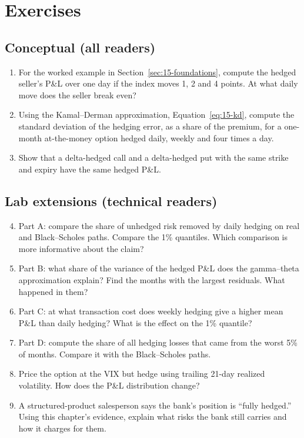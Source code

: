 \section*{Exercises}

\subsection*{Conceptual (all readers)}

\begin{enumerate}
  \item For the worked example in Section~\ref{sec:15-foundations}, compute the hedged seller's P\&L over one day if the index moves 1, 2 and 4 points. At what daily move does the seller break even?
  \item Using the Kamal--Derman approximation, Equation~\eqref{eq:15-kd}, compute the standard deviation of the hedging error, as a share of the premium, for a one-month at-the-money option hedged daily, weekly and four times a day.
  \item Show that a delta-hedged call and a delta-hedged put with the same strike and expiry have the same hedged P\&L.
\end{enumerate}

\subsection*{Lab extensions (technical readers)}

\begin{enumerate}
  \setcounter{enumi}{3}
  \item Part A: compare the share of unhedged risk removed by daily hedging on real and Black--Scholes paths. Compare the 1\% quantiles. Which comparison is more informative about the claim?
  \item Part B: what share of the variance of the hedged P\&L does the gamma--theta approximation explain? Find the months with the largest residuals. What happened in them?
  \item Part C: at what transaction cost does weekly hedging give a higher mean P\&L than daily hedging? What is the effect on the 1\% quantile?
  \item Part D: compute the share of all hedging losses that came from the worst 5\% of months. Compare it with the Black--Scholes paths.
  \item Price the option at the VIX but hedge using trailing 21-day realized volatility. How does the P\&L distribution change?
  \item A structured-product salesperson says the bank's position is ``fully hedged.'' Using this chapter's evidence, explain what risks the bank still carries and how it charges for them.
\end{enumerate}


